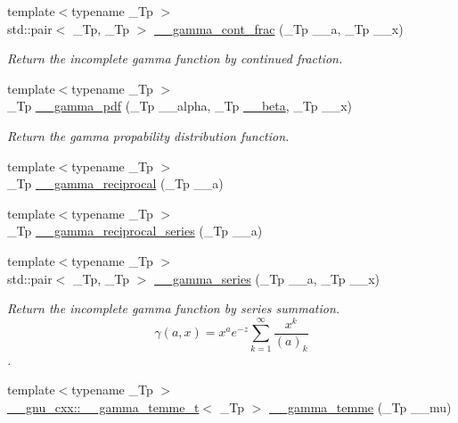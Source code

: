\begin{DoxyCompactItemize}
{\footnotesize template$<$typename \+\_\+\+Tp $>$ }\\std\+::pair$<$ \+\_\+\+Tp, \+\_\+\+Tp $>$ \hyperlink{namespacestd_1_1____detail_afd6319747af991947a02388acee40c26}{\+\_\+\+\_\+gamma\+\_\+cont\+\_\+frac} (\+\_\+\+Tp \+\_\+\+\_\+a, \+\_\+\+Tp \+\_\+\+\_\+x)
\begin{DoxyCompactList}\small\item\em Return the incomplete gamma function by continued fraction. \end{DoxyCompactList}\item 
{\footnotesize template$<$typename \+\_\+\+Tp $>$ }\\\+\_\+\+Tp \hyperlink{namespacestd_1_1____detail_a13146321e4e094815de990c33b83b02a}{\+\_\+\+\_\+gamma\+\_\+pdf} (\+\_\+\+Tp \+\_\+\+\_\+alpha, \+\_\+\+Tp \hyperlink{namespacestd_1_1____detail_a090d2f0920e0d208c467609b2a81d717}{\+\_\+\+\_\+beta}, \+\_\+\+Tp \+\_\+\+\_\+x)
\begin{DoxyCompactList}\small\item\em Return the gamma propability distribution function. \end{DoxyCompactList}\item 
{\footnotesize template$<$typename \+\_\+\+Tp $>$ }\\\+\_\+\+Tp \hyperlink{namespacestd_1_1____detail_a8ac187fda39e0c55614e4c58146f871c}{\+\_\+\+\_\+gamma\+\_\+reciprocal} (\+\_\+\+Tp \+\_\+\+\_\+a)
\item 
{\footnotesize template$<$typename \+\_\+\+Tp $>$ }\\\+\_\+\+Tp \hyperlink{namespacestd_1_1____detail_a08dc6d850e2f02ff45deaa4772298cf3}{\+\_\+\+\_\+gamma\+\_\+reciprocal\+\_\+series} (\+\_\+\+Tp \+\_\+\+\_\+a)
\item 
{\footnotesize template$<$typename \+\_\+\+Tp $>$ }\\std\+::pair$<$ \+\_\+\+Tp, \+\_\+\+Tp $>$ \hyperlink{namespacestd_1_1____detail_aa480c595e1c5b894d76398cf0e8eb02b}{\+\_\+\+\_\+gamma\+\_\+series} (\+\_\+\+Tp \+\_\+\+\_\+a, \+\_\+\+Tp \+\_\+\+\_\+x)
\begin{DoxyCompactList}\small\item\em Return the incomplete gamma function by series summation. \[ \gamma(a,x) = x^a e^{-z}\sum_{k=1}^{\infty} \frac{x^k}{(a)_k} \]. \end{DoxyCompactList}\item 
{\footnotesize template$<$typename \+\_\+\+Tp $>$ }\\\hyperlink{struct____gnu__cxx_1_1____gamma__temme__t}{\+\_\+\+\_\+gnu\+\_\+cxx\+::\+\_\+\+\_\+gamma\+\_\+temme\+\_\+t}$<$ \+\_\+\+Tp $>$ \hyperlink{namespacestd_1_1____detail_a0d4fa90f527fd05d057b27ba0366488a}{\+\_\+\+\_\+gamma\+\_\+temme} (\+\_\+\+Tp \+\_\+\+\_\+mu)

\end{DoxyCompactItemize}
